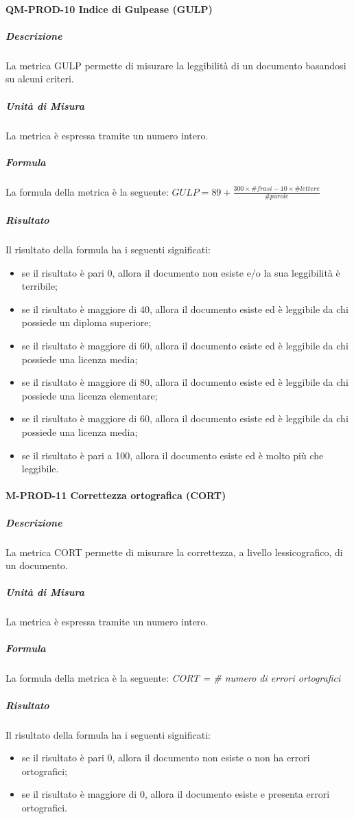			\paragraph{QM-PROD-10 Indice di Gulpease (GULP)}
				\subparagraph{Descrizione}
					La metrica GULP permette di misurare la leggibilità di un documento basandosi su alcuni criteri.
				\subparagraph{Unità di Misura}
					La metrica è espressa tramite un numero intero.
				\subparagraph{Formula}
					La formula della metrica è la seguente:
					\(
						GULP = 89+\frac{300\times\# frasi-10\times\#lettere}{\#parole}
					\)
				\subparagraph{Risultato}
					Il risultato della formula ha i seguenti significati:
					\begin{itemize}
						\item se il risultato è pari 0, allora il documento non esiste e/o la sua leggibilità è terribile;
						\item se il risultato è maggiore di 40, allora il documento esiste ed è leggibile da chi possiede un diploma superiore;
						\item se il risultato è maggiore di 60, allora il documento esiste ed è leggibile da chi possiede una licenza media;
						\item se il risultato è maggiore di 80, allora il documento esiste ed è leggibile da chi possiede una licenza elementare;
						\item se il risultato è maggiore di 60, allora il documento esiste ed è leggibile da chi possiede una licenza media;
						\item se il risultato è pari a 100, allora il documento esiste ed è molto più che leggibile.
					\end{itemize}
			\paragraph{M-PROD-11 Correttezza ortografica (CORT)}
				\subparagraph{Descrizione}
				La metrica CORT permette di misurare la correttezza, a livello lessicografico, di un documento.
				\subparagraph{Unità di Misura}
					La metrica è espressa tramite un numero intero.
				\subparagraph{Formula}
					La formula della metrica è la seguente:
					\textit{CORT = \# numero di errori ortografici}
				\subparagraph{Risultato}
					Il risultato della formula ha i seguenti significati:
					\begin{itemize}
						\item se il risultato è pari 0, allora il documento non esiste o non ha errori ortografici;
						\item se il risultato è maggiore di 0, allora il documento esiste e presenta errori ortografici.
					\end{itemize}
